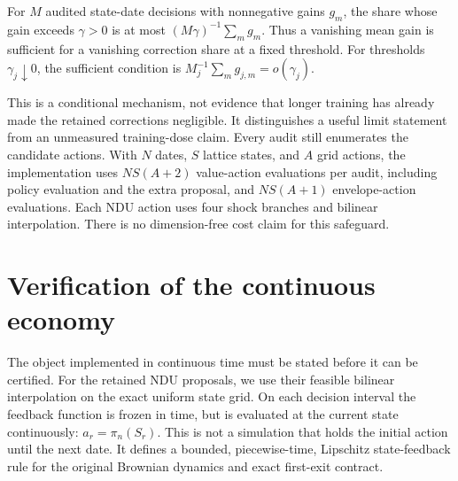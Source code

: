 \begin{proposition}\label{r8:overrides}
For $M$ audited state-date decisions with nonnegative gains $g_m$, the share whose gain exceeds $\gamma>0$ is at most $(M\gamma)^{-1}\sum_m g_m$. Thus a vanishing mean gain is sufficient for a vanishing correction share at a fixed threshold. For thresholds $\gamma_j\downarrow0$, the sufficient condition is $M_j^{-1}\sum_mg_{j,m}=o(\gamma_j)$.
\end{proposition}
This is a conditional mechanism, not evidence that longer training has already made the retained corrections negligible. It distinguishes a useful limit statement from an unmeasured training-dose claim. Every audit still enumerates the candidate actions. With $N$ dates, $S$ lattice states, and $A$ grid actions, the implementation uses $NS(A+2)$ value-action evaluations per audit, including policy evaluation and the extra proposal, and $NS(A+1)$ envelope-action evaluations. Each NDU action uses four shock branches and bilinear interpolation. There is no dimension-free cost claim for this safeguard.

\section{Verification of the continuous economy}\label{r8:verification}
The object implemented in continuous time must be stated before it can be certified. For the retained NDU proposals, we use their feasible bilinear interpolation on the exact uniform state grid. On each decision interval the feedback function is frozen in time, but is evaluated at the current state continuously: $a_r=\pi_n(S_r)$. This is not a simulation that holds the initial action until the next date. It defines a bounded, piecewise-time, Lipschitz state-feedback rule for the original Brownian dynamics and exact first-exit contract.

